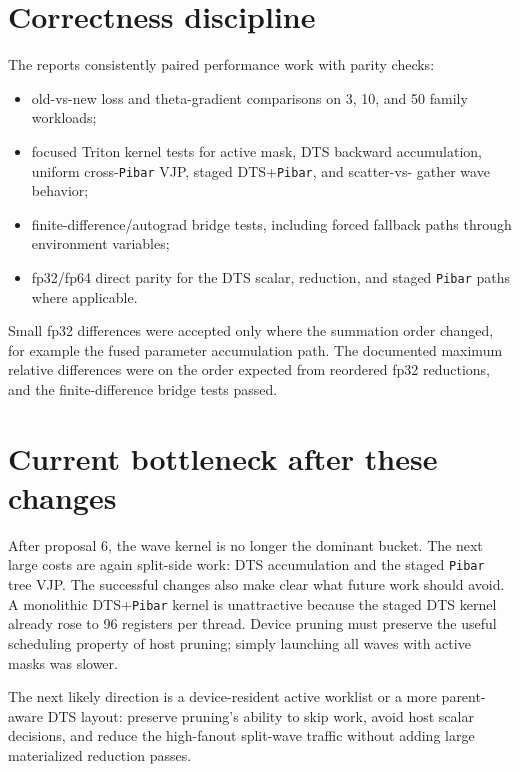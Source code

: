 \documentclass[11pt]{article}
\newcommand{\code}[1]{\texttt{#1}}
\begin{document}
\section{Correctness discipline}

The reports consistently paired performance work with parity checks:

\begin{itemize}[leftmargin=*]
\item old-vs-new loss and theta-gradient comparisons on 3, 10, and 50 family
      workloads;
\item focused Triton kernel tests for active mask, DTS backward accumulation,
      uniform cross-\code{Pibar} VJP, staged DTS+\code{Pibar}, and scatter-vs-
      gather wave behavior;
\item finite-difference/autograd bridge tests, including forced fallback paths
      through environment variables;
\item fp32/fp64 direct parity for the DTS scalar, reduction, and staged
      \code{Pibar} paths where applicable.
\end{itemize}

Small fp32 differences were accepted only where the summation order changed,
for example the fused parameter accumulation path.  The documented maximum
relative differences were on the order expected from reordered fp32 reductions,
and the finite-difference bridge tests passed.

\section{Current bottleneck after these changes}

After proposal 6, the wave kernel is no longer the dominant bucket.  The next
large costs are again split-side work: DTS accumulation and the staged
\code{Pibar} tree VJP.  The successful changes also make clear what future work
should avoid.  A monolithic DTS+\code{Pibar} kernel is unattractive because the
staged DTS kernel already rose to 96 registers per thread.  Device pruning must
preserve the useful scheduling property of host pruning; simply launching all
waves with active masks was slower.

The next likely direction is a device-resident active worklist or a more
parent-aware DTS layout: preserve pruning's ability to skip work, avoid host
scalar decisions, and reduce the high-fanout split-wave traffic without adding
large materialized reduction passes.
\end{document}
